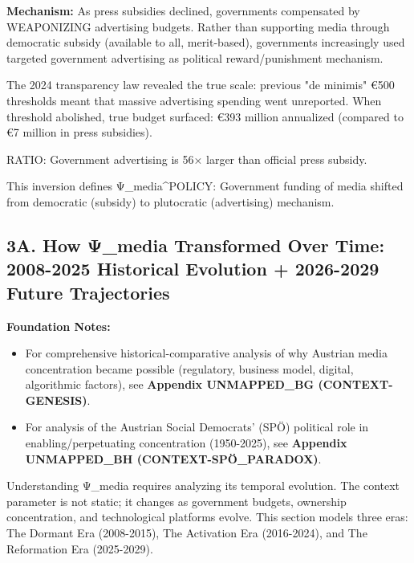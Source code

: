 \textbf{Mechanism:} As press subsidies declined, governments compensated by
WEAPONIZING advertising budgets. Rather than supporting media through democratic
subsidy (available to all, merit-based), governments increasingly used targeted
government advertising as political reward/punishment mechanism.

The 2024 transparency law revealed the true scale: previous "de minimis" €500
thresholds meant that massive advertising spending went unreported. When threshold
abolished, true budget surfaced: €393 million annualized (compared to €7 million
in press subsidies).

RATIO: Government advertising is 56× larger than official press subsidy.

This inversion defines Ψ\_media^{POLICY}: Government funding of media shifted
from democratic (subsidy) to plutocratic (advertising) mechanism.

\label{sec:dx-dynamic-psi-media}

\subsection*{3A. How Ψ_media Transformed Over Time: 2008-2025 Historical Evolution + 2026-2029 Future Trajectories}

\textbf{Foundation Notes:}
\begin{itemize}[nosep]
\item For comprehensive historical-comparative analysis of why Austrian media concentration became possible
  (regulatory, business model, digital, algorithmic factors), see \textbf{Appendix UNMAPPED_BG (CONTEXT-GENESIS)}.
\item For analysis of the Austrian Social Democrats' (SPÖ) political role in enabling/perpetuating concentration (1950-2025),
  see \textbf{Appendix UNMAPPED_BH (CONTEXT-SPÖ_PARADOX)}.
\end{itemize}

Understanding Ψ_media requires analyzing its temporal evolution. The context parameter is not static;
it changes as government budgets, ownership concentration, and technological platforms evolve. This
section models three eras: The Dormant Era (2008-2015), The Activation Era (2016-2024), and The
Reformation Era (2025-2029).


